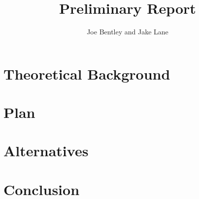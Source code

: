 \documentclass{article}
\title{Preliminary Report}
\author{Joe Bentley and Jake Lane}
\begin{document}
\section{Theoretical Background}
\section{Plan}
\section{Alternatives}
\section{Conclusion}
\end{document}
